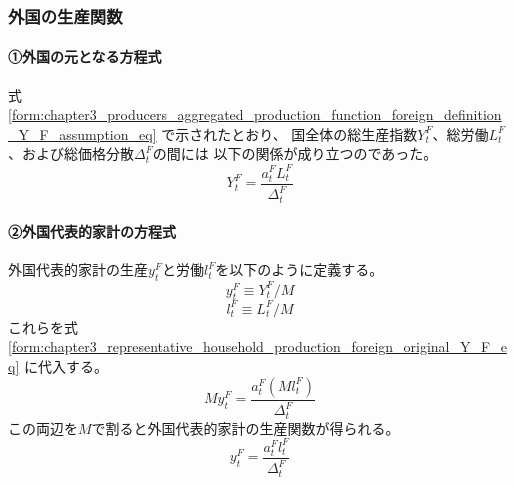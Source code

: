 \subsubsection{外国の生産関数}
\label{sec:chapter3_representative_household_production_foreign}

\paragraph{①外国の元となる方程式}
\label{sec:chapter3_representative_household_production_foreign_original}
式
\eqref{form:chapter3_producers_aggregated_production_function_foreign_definition_Y_F_assumption_eq}
で示されたとおり、
国全体の総生産指数\(Y_t^F\)、総労働\(L_t^F\)、および総価格分散\(\Delta_t^F\)の間には
以下の関係が成り立つのであった。
\begin{equation}
\label{form:chapter3_representative_household_production_foreign_original_Y_F_eq}
    Y_t^F=\frac{a_t^FL_t^F}{\Delta_t^F}
\end{equation}

\paragraph{②外国代表的家計の方程式}
\label{sec:chapter3_representative_household_production_foreign_representative}
外国代表的家計の生産\(y_t^F\)と労働\(l_t^F\)を以下のように定義する。
\begin{equation}
\label{form:chapter3_representative_household_production_foreign_representative_y_F_def}
    y_t^F\equiv Y_t^F/M
\end{equation}
\begin{equation}
\label{form:chapter3_representative_household_production_foreign_representative_l_F_def}
    l_t^F\equiv L_t^F/M
\end{equation}
これらを式
\eqref{form:chapter3_representative_household_production_foreign_original_Y_F_eq}
に代入する。
\begin{equation}
\label{form:chapter3_representative_household_production_foreign_original_y_F_eq}
    My_t^F=\frac{a_t^F(Ml_t^F)}{\Delta_t^F}
\end{equation}
この両辺を\(M\)で割ると外国代表的家計の生産関数が得られる。
\begin{equation}
\label{form:chapter3_representative_household_production_foreign_original_y_F_modified_eq}
    y_t^F=\frac{a_t^Fl_t^F}{\Delta_t^F}
\end{equation}